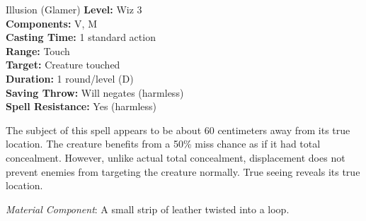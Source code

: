 {Illusion (Glamer)}
{
	\textbf{Level:}
	Wiz 3\\
	\textbf{Components:}
	V, M\\
	\textbf{Casting Time:}
	1 standard action\\
	\textbf{Range:}
	Touch\\
	\textbf{Target:}
	Creature touched\\
	\textbf{Duration:}
	1 round/level (D)\\
	\textbf{Saving Throw:}
	Will negates (harmless)\\
	\textbf{Spell Resistance:}
	Yes (harmless)\\
}
{
	The subject of this spell appears to be about 60 centimeters away from its true location. The creature benefits from a 50\% miss chance as if it had total concealment. However, unlike actual total concealment, displacement does not prevent enemies from targeting the creature normally. True seeing reveals its true location.

	\textit{Material Component}:
	A small strip of leather twisted into a loop.

}
